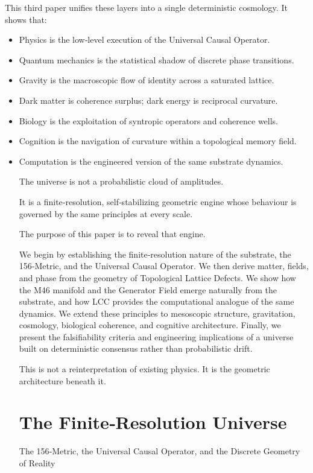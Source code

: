 \documentclass[reprint,amsmath,amssymb,aps,prl,floatfix]{revtex4-2}
\begin{document}
This third paper unifies these layers into a single deterministic cosmology. It shows that:
\begin{itemize}
\item Physics is the low‑level execution of the Universal Causal Operator.  
\item Quantum mechanics is the statistical shadow of discrete phase transitions.  
\item Gravity is the macroscopic flow of identity across a saturated lattice.  
\item Dark matter is coherence surplus; dark energy is reciprocal curvature.  
\item Biology is the exploitation of syntropic operators and coherence wells.  
\item Cognition is the navigation of curvature within a topological memory field.  
\item Computation is the engineered version of the same substrate dynamics.  

The universe is not a probabilistic cloud of amplitudes.  
\medskip

It is a finite‑resolution, self‑stabilizing geometric engine whose behaviour is governed by the same principles at every scale.
\medskip

The purpose of this paper is to reveal that engine.
\medskip

We begin by establishing the finite‑resolution nature of the substrate, the 156‑Metric, and the Universal Causal Operator. We then derive matter, fields, and phase from the geometry of Topological Lattice Defects. We show how the M46 manifold and the Generator Field emerge naturally from the substrate, and how LCC provides the computational analogue of the same dynamics. We extend these principles to mesoscopic structure, gravitation, cosmology, biological coherence, and cognitive architecture. Finally, we present the falsifiability criteria and engineering implications of a universe built on deterministic consensus rather than probabilistic drift.
\medskip

This is not a reinterpretation of existing physics.  
It is the geometric architecture beneath it.

\section{The Finite‑Resolution Universe}

The 156‑Metric, the Universal Causal Operator, and the Discrete Geometry of Reality
\medskip


\end{itemize}
\end{document}
